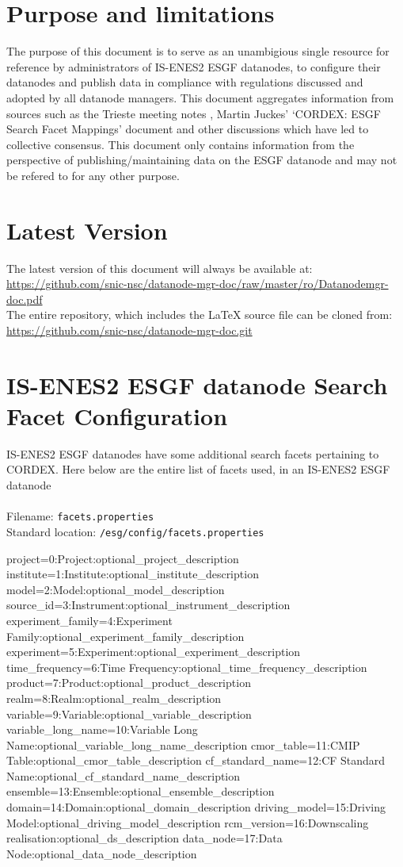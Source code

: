 \section{Purpose and limitations}
The purpose of this document is to serve as an unambigious single resource for reference by administrators of IS-ENES2 ESGF datanodes, to configure their datanodes and publish data in compliance with regulations discussed and adopted by all datanode managers. This document aggregates information from sources such as the Trieste meeting notes \cite{trieste}, Martin Juckes' `CORDEX: ESGF Search Facet Mappings' document \cite{cordexfacetsdoc} and other discussions which have led to collective consensus. This document only contains information from the perspective of publishing/maintaining data on the ESGF datanode and may not be refered to for any other purpose.

\section{Latest Version}
The latest version of this document will always be available at:\\
\url{https://github.com/snic-nsc/datanode-mgr-doc/raw/master/ro/Datanodemgr-doc.pdf} \\
The entire repository, which includes the \LaTeX{} source file can be cloned from:\\
\url{https://github.com/snic-nsc/datanode-mgr-doc.git}


\section{IS-ENES2 ESGF datanode Search Facet Configuration}
IS-ENES2 ESGF datanodes have some additional search facets pertaining to CORDEX. Here below are the entire list of facets used, in an IS-ENES2 ESGF datanode\\
\vspace{1mm}\\
Filename: \texttt{facets.properties}\\
Standard location: \texttt{/esg/config/facets.properties}
\begin{verbatimtab}[4]
project=0:Project:optional_project_description
institute=1:Institute:optional_institute_description
model=2:Model:optional_model_description
source_id=3:Instrument:optional_instrument_description
experiment_family=4:Experiment Family:optional_experiment_family_description
experiment=5:Experiment:optional_experiment_description
time_frequency=6:Time Frequency:optional_time_frequency_description
product=7:Product:optional_product_description
realm=8:Realm:optional_realm_description
variable=9:Variable:optional_variable_description
variable_long_name=10:Variable Long Name:optional_variable_long_name_description
cmor_table=11:CMIP Table:optional_cmor_table_description
cf_standard_name=12:CF Standard Name:optional_cf_standard_name_description
ensemble=13:Ensemble:optional_ensemble_description
domain=14:Domain:optional_domain_description
driving_model=15:Driving Model:optional_driving_model_description
rcm_version=16:Downscaling realisation:optional_ds_description
data_node=17:Data Node:optional_data_node_description
\end{verbatimtab}

